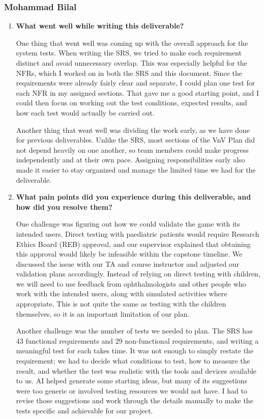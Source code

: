 \documentclass[10pt,titlepage]{article}
\begin{document}
\subsubsection*{Mohammad Bilal}

\begin{enumerate}
    \item \textbf{What went well while writing this deliverable?}

    One thing that went well was coming up with the overall approach for the
    system tests. When writing the SRS, we tried to make each requirement distinct
    and avoid unnecessary overlap. This was especially helpful for the NFRs,
    which I worked on in both the SRS and this document. Since the requirements
    were already fairly clear and separate, I could plan one test for each NFR
    in my assigned sections. That gave me a good starting point, and I could
    then focus on working out the test conditions, expected results, and how
    each test would actually be carried out.

    Another thing that went well was dividing the work early, as we have done
    for previous deliverables. Unlike the SRS, most sections of the VnV Plan
    did not depend heavily on one another, so team members could make progress
    independently and at their own pace. Assigning responsibilities early also
    made it easier to stay organized and manage the limited time we had for
    the deliverable.

    \item \textbf{What pain points did you experience during this
    deliverable, and how did you resolve them?}

    One challenge was figuring out how we could validate the game with its
    intended users. Direct testing with paediatric patients would require
    Research Ethics Board (REB) approval, and our supervisor explained that
    obtaining this approval would likely be infeasible within the capstone
    timeline. We discussed the issue with our TA and course instructor and
    adjusted our validation plans accordingly. Instead of relying on direct
    testing with children, we will need to use feedback from ophthalmologists
    and other people who work with the intended users, along with simulated
    activities where appropriate. This is not quite the same as testing with
    the children themselves, so it is an important limitation of our plan.

    Another challenge was the number of tests we needed to plan. The SRS has
    43 functional requirements and 29 non-functional requirements, and writing
    a meaningful test for each takes time. It was not enough to simply restate
    the requirement; we had to decide what conditions to test, how to measure
    the result, and whether the test was realistic with the tools and devices
    available to us. AI helped generate some starting ideas, but many of its
    suggestions were too generic or involved testing resources we would not
    have. I had to revise those suggestions and work through the details
    manually to make the tests specific and achievable for our project.


\end{enumerate}
\end{document}

